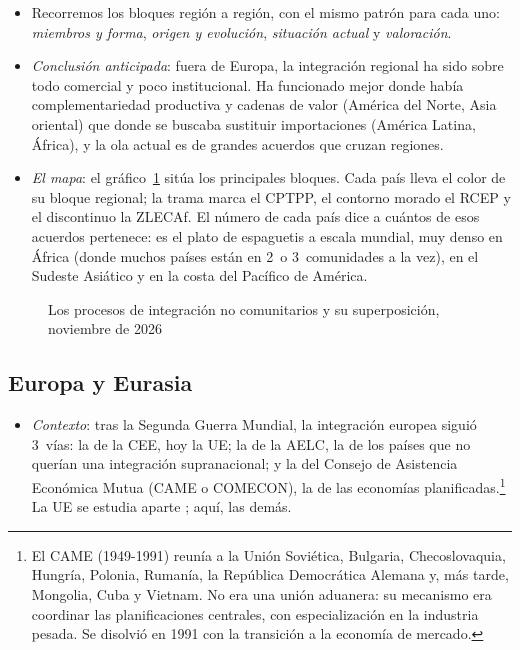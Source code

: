 \documentclass[11pt]{article}
\begin{document}
\begin{itemize}
\item Recorremos los bloques región a región, con el mismo patrón para cada uno: \emph{miembros y forma}, \emph{origen y evolución}, \emph{situación actual} y \emph{valoración}.
\item \emph{Conclusión anticipada}: fuera de Europa, la integración regional ha sido sobre todo comercial y poco institucional. Ha funcionado mejor donde había complementariedad productiva y cadenas de valor (América del Norte, Asia oriental) que donde se buscaba sustituir importaciones (América Latina, África), y la ola actual es de grandes acuerdos que cruzan regiones.
\item \emph{El mapa}: el gráfico~\ref{fig:mapa} sitúa los principales bloques. Cada país lleva el color de su bloque regional; la trama marca el CPTPP, el contorno morado el RCEP y el discontinuo la ZLECAf. El número de cada país dice a cuántos de esos acuerdos pertenece: es el plato de espaguetis a escala mundial, muy denso en África (donde muchos países están en 2~o 3~comunidades a la vez), en el Sudeste Asiático y en la costa del Pacífico de América.
\end{itemize}

\begin{figure}[H]
\centering
\caption{Los procesos de integración no comunitarios y su superposición, noviembre de 2026}\label{fig:mapa}
\end{figure}

\subsection{Europa y Eurasia}\label{sec:europa}

\begin{itemize}
\item \emph{Contexto}: tras la Segunda Guerra Mundial, la integración europea siguió 3~vías: la de la CEE, hoy la UE; la de la AELC, la de los países que no querían una integración supranacional; y la del Consejo de Asistencia Económica Mutua (CAME o COMECON), la de las economías planificadas.\footnote{El CAME (1949-1991) reunía a la Unión Soviética, Bulgaria, Checoslovaquia, Hungría, Polonia, Rumanía, la República Democrática Alemana y, más tarde, Mongolia, Cuba y Vietnam. No era una unión aduanera: su mecanismo era coordinar las planificaciones centrales, con especialización en la industria pesada. Se disolvió en 1991 con la transición a la economía de mercado.} La UE se estudia aparte ; aquí, las demás.
\end{itemize}
\end{document}
